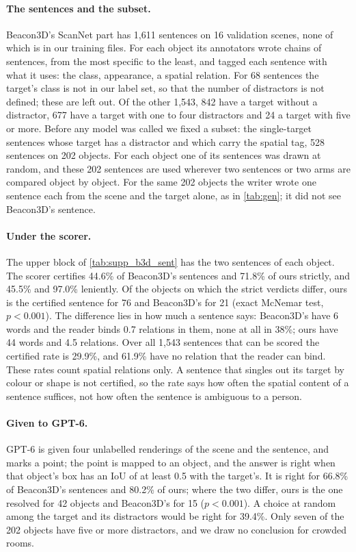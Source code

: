 \paragraph{The sentences and the subset.}
Beacon3D's ScanNet part has 1,611 sentences on 16 validation scenes, none of which is in our training files.
For each object its annotators wrote chains of sentences, from the most specific to the least, and tagged each sentence with what it uses: the class, appearance, a spatial relation.
For 68 sentences the target's class is not in our label set, so that the number of distractors is not defined; these are left out.
Of the other 1,543, 842 have a target without a distractor, 677 have a target with one to four distractors and 24 a target with five or more.
Before any model was called we fixed a subset: the single-target sentences whose target has a distractor and which carry the spatial tag, 528 sentences on 202 objects.
For each object one of its sentences was drawn at random, and these 202 sentences are used wherever two sentences or two arms are compared object by object.
For the same 202 objects the writer wrote one sentence each from the scene and the target alone, as in \cref{tab:gen}; it did not see Beacon3D's sentence.

\paragraph{Under the scorer.}
The upper block of \cref{tab:supp_b3d_sent} has the two sentences of each object.
The scorer certifies 44.6\% of Beacon3D's sentences and 71.8\% of ours strictly, and 45.5\% and 97.0\% leniently.
Of the objects on which the strict verdicts differ, ours is the certified sentence for 76 and Beacon3D's for 21 (exact McNemar test, $p < 0.001$).
The difference lies in how much a sentence says: Beacon3D's have 6 words and the reader binds 0.7 relations in them, none at all in 38\%; ours have 44 words and 4.5 relations.
Over all 1,543 sentences that can be scored the certified rate is 29.9\%, and 61.9\% have no relation that the reader can bind.
These rates count spatial relations only.
A sentence that singles out its target by colour or shape is not certified, so the rate says how often the spatial content of a sentence suffices, not how often the sentence is ambiguous to a person.

\paragraph{Given to GPT-6.}
GPT-6 is given four unlabelled renderings of the scene and the sentence, and marks a point; the point is mapped to an object, and the answer is right when that object's box has an IoU of at least 0.5 with the target's.
It is right for 66.8\% of Beacon3D's sentences and 80.2\% of ours; where the two differ, ours is the one resolved for 42 objects and Beacon3D's for 15 ($p < 0.001$).
A choice at random among the target and its distractors would be right for 39.4\%.
Only seven of the 202 objects have five or more distractors, and we draw no conclusion for crowded rooms.


